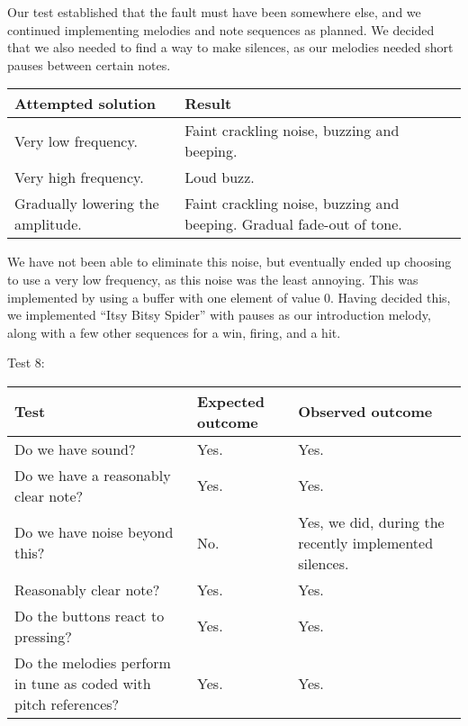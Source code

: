 Our test established that the fault must have been somewhere else, and we
continued implementing melodies and note sequences as planned. We
decided that we also needed to find a way to make silences, as our
melodies needed short pauses between certain notes.

\begin{center}
\begin{tabular}{|p{5cm}|p{5cm}|}
\hline
{\sc Attempted solution} & {\sc Result} \\ \hline
Very low frequency.	& Faint crackling noise, buzzing and beeping.  \\ \hline
Very high frequency. & Loud buzz.  \\ \hline
Gradually lowering the amplitude. & Faint crackling noise, buzzing and beeping. Gradual fade-out of tone. \\ \hline
\end{tabular}
\end{center}

We have not been able to eliminate this noise, but eventually ended up
choosing to use a very low frequency, as this noise was the least
annoying. This was implemented by using a buffer with one element of
value 0. Having decided this, we implemented ``Itsy Bitsy Spider'' with
pauses as our introduction melody, along with a few other sequences for
a win, firing, and a hit.

Test 8:
\begin{center}
\begin{tabular}{|p{3.6cm}|p{3.6cm}|p{3.6cm}|}
\hline
{\sc Test} & {\sc Expected outcome} & {\sc Observed outcome}\\ \hline
Do we have sound? & Yes. & Yes. \\ \hline
Do we have a reasonably clear note? & Yes. & Yes. \\ \hline
Do we have noise beyond this? & No. & Yes, we did, during the recently implemented silences. \\ \hline
Reasonably clear note? & Yes. & Yes. \\ \hline
Do the buttons react to pressing? & Yes. & Yes. \\ \hline
Do the melodies perform in tune as coded with pitch references? & Yes. &
Yes. \\ \hline
\end{tabular}
\end{center}
